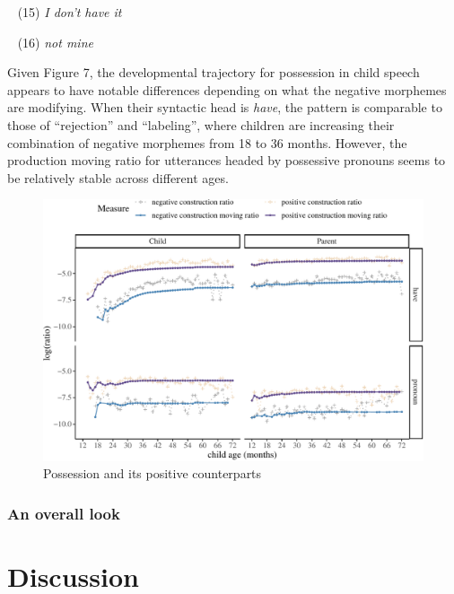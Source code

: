 \documentclass[
  english,
  man,floatsintext]{apa6}
\begin{document}
~
(15) \emph{I don't have it}

~
(16) \emph{not mine}

Given Figure 7, the developmental trajectory for possession in child speech appears to have notable differences depending on what the negative morphemes are modifying. When their syntactic head is \emph{have}, the pattern is comparable to those of \enquote{rejection} and \enquote{labeling}, where children are increasing their combination of negative morphemes from 18 to 36 months. However, the production moving ratio for utterances headed by possessive pronouns seems to be relatively stable across different ages.

\begin{figure}[H]

{\centering \includegraphics{neg_construction_article_files/figure-latex/possession-1} 

}

\caption{Possession and its positive counterparts}\label{fig:possession}
\end{figure}

\clearpage

\hypertarget{an-overall-look}{%
\subsubsection{An overall look}\label{an-overall-look}}

\hypertarget{discussion}{%
\section{Discussion}\label{discussion}}
\end{document}

